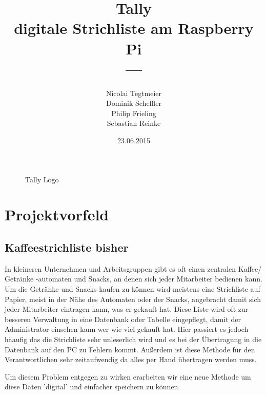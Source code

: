 \documentclass[11pt,a4paper]{article} %
\title{\normalfont\bfseries{Tally\\ digitale Strichliste am Raspberry Pi}\\---}
\author{Nicolai Tegtmeier \\ Dominik Scheffler \\ Philip Frieling \\ Sebastian Reinke}
\date{23.06.2015}
\begin{document}



\begin{titlepage}
	\maketitle
	\begin{figure}[h]
	\caption{Tally Logo}
	\end{figure}
\end{titlepage}

\tableofcontents
\newpage

\section{Projektvorfeld}
\label{Grundlagen}


\subsection{Kaffeestrichliste bisher}

In kleineren Unternehmen und Arbeitsgruppen gibt es oft einen zentralen Kaffee/ Getränke -automaten und Snacks, an denen sich jeder Mitarbeiter bedienen kann. Um die Getränke und Snacks kaufen zu können wird meistens eine Strichliste auf Papier, meist in der Nähe des Automaten oder der Snacks, angebracht damit sich jeder Mitarbeiter eintragen kann, was er gekauft hat. Diese Liste wird oft zur besseren Verwaltung in eine Datenbank oder Tabelle eingepflegt, damit der Administrator einsehen kann wer wie viel gekauft hat. Hier passiert es jedoch häaufig das die Strichliste sehr unleserlich wird und es bei der Übertragung in die Datenbank auf den PC zu Fehlern kommt. Außerdem ist diese Methode für den Verantwortlichen sehr zeitaufwendig da alles per Hand übertragen werden muss.
\par
Um diesem Problem entgegen zu wirken erarbeiten wir eine neue Methode um diese Daten 'digital' und einfacher speichern zu können.
\end{document}
